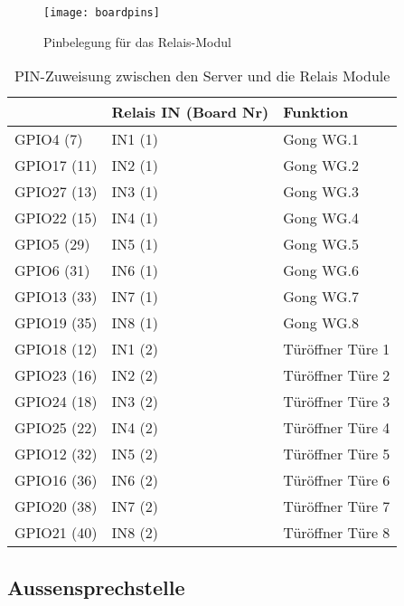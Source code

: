 \begin{figure}[htb!]
	\begin{center}
		\texttt{[image: boardpins]}
		\caption[EthernetPinbelegung]{Pinbelegung für das Relais-Modul}
		\label{fig:boardpins}
	\end{center}
\end{figure}

\begin{table}[]
	\centering
	\label{my-label}
	\begin{tabular}{l|ll}
		\multicolumn{1}{r|}{} \textbf{Pi GPIO (PIN)} & \textbf{Relais IN (Board Nr)} & \textbf{Funktion}  \hspace{60pt}	\\ \hline
		GPIO4 (7)	&	IN1 (1)			& Gong WG.1			\\ \hline
		GPIO17 (11)	&	IN2 (1)			& Gong WG.2			\\ \hline
		GPIO27 (13)	&	IN3 (1)			& Gong WG.3			\\ \hline
		GPIO22 (15)	&	IN4 (1)			& Gong WG.4			\\ \hline
		GPIO5 (29)	&	IN5 (1)			& Gong WG.5			\\ \hline
		GPIO6 (31)	&	IN6 (1)			& Gong WG.6			\\ \hline
		GPIO13 (33)	&	IN7 (1)			& Gong WG.7			\\ \hline
		GPIO19 (35)	&	IN8 (1)			& Gong WG.8			\\ \hline
		GPIO18 (12)	&	IN1 (2)			& Türöffner Türe 1			\\ \hline
		GPIO23 (16)	&	IN2 (2)			& Türöffner Türe 2			\\ \hline
		GPIO24 (18)	&	IN3 (2)			& Türöffner Türe 3			\\ \hline
		GPIO25 (22)	&	IN4 (2)			& Türöffner Türe 4			\\ \hline
		GPIO12 (32)	&	IN5 (2)			& Türöffner Türe 5			\\ \hline
		GPIO16 (36)	&	IN6 (2)			& Türöffner Türe 6			\\ \hline
		GPIO20 (38)	&	IN7 (2)			& Türöffner Türe 7			\\ \hline
		GPIO21 (40)	&	IN8 (2)			& Türöffner Türe 8			\\ \hline
	\end{tabular}
	\caption{PIN-Zuweisung zwischen den Server und die Relais Module}
	\label{tbl:pinroutes}
\end{table}


\subsection{Aussensprechstelle}
\label{sec:chapterexample}

